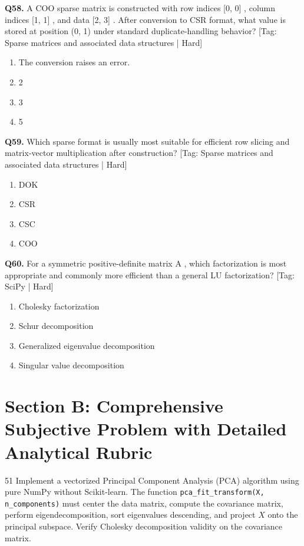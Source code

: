 \vspace{2mm}
\noindent\textbf{Q58.} A COO sparse matrix is constructed with row indices [0, 0] , column indices [1, 1] , and data [2, 3] . After conversion to CSR format, what value is stored at position (0, 1) under standard duplicate-handling behavior? \hfill [Tag: Sparse matrices and associated data structures | Hard]
\begin{enumerate}[label=(\alph*),topsep=2pt,itemsep=1pt,partopsep=0pt,parsep=0pt]
    \item {The conversion raises an error.}
    \item {2}
    \item {3}
    \item {5}
\end{enumerate}
\vspace{2mm}
\noindent\textbf{Q59.} Which sparse format is usually most suitable for efficient row slicing and matrix-vector multiplication after construction? \hfill [Tag: Sparse matrices and associated data structures | Hard]
\begin{enumerate}[label=(\alph*),topsep=2pt,itemsep=1pt,partopsep=0pt,parsep=0pt]
    \item {DOK}
    \item {CSR}
    \item {CSC}
    \item {COO}
\end{enumerate}
\vspace{2mm}
\noindent\textbf{Q60.} For a symmetric positive-definite matrix A , which factorization is most appropriate and commonly more efficient than a general LU factorization? \hfill [Tag: SciPy | Hard]
\begin{enumerate}[label=(\alph*),topsep=2pt,itemsep=1pt,partopsep=0pt,parsep=0pt]
    \item {Cholesky factorization}
    \item {Schur decomposition}
    \item {Generalized eigenvalue decomposition}
    \item {Singular value decomposition}
\end{enumerate}
\vspace{2mm}

\section{Section B: Comprehensive Subjective Problem with Detailed Analytical Rubric}

\begin{subjectiveq}{5}{1}
Implement a vectorized Principal Component Analysis (PCA) algorithm using pure NumPy without Scikit-learn. The function \texttt{pca\_fit\_transform(X, n\_components)} must center the data matrix, compute the covariance matrix, perform eigendecomposition, sort eigenvalues descending, and project $X$ onto the principal subspace. Verify Cholesky decomposition validity on the covariance matrix.
\end{subjectiveq}

